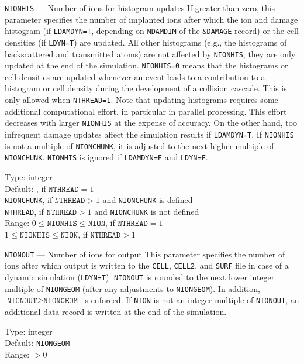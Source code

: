 \begin{keydescription}{\texttt{NIONHIS} --- Number of ions for histogram updates}
%
  If greater than zero, this parameter specifies the number of implanted ions
  after which the ion and damage histogram (if \texttt{LDAMDYN=T}, depending on 
  \texttt{NDAMDIM} of the \texttt{\&DAMAGE} record) or the cell
  densities (if \texttt{LDYN=T}) are updated. All other histograms (e.g., the 
  histograms of backscattered and transmitted atoms) are not affected
  by \texttt{NIONHIS}; they are only updated at the end of the simulation. 
  \texttt{NIONHIS=0} means that the histograms or cell densities are 
  updated whenever an event leads to a contribution to a histogram or cell
  density during the development of a collision cascade. This is only
  allowed when \texttt{NTHREAD=1}. Note that updating histograms requires some
  additional computational effort, in particular in parallel processing. This 
  effort decreases with larger \texttt{NIONHIS} at the expense of accuracy. On
  the other hand, too infrequent damage updates affect the simulation results
  if \texttt{LDAMDYN=T}. If \texttt{NIONHIS} is not a multiple of
  \texttt{NIONCHUNK}, it is adjusted to the next higher multiple of
  \texttt{NIONCHUNK}. \texttt{NIONHIS} is ignored if \texttt{LDAMDYN=F} and
  \texttt{LDYN=F}.
  \begin{keytab}
    Type:    \> integer \\
    Default: , if $\texttt{NTHREAD} = 1$ \\
             \> \texttt{NIONCHUNK}, if $\texttt{NTHREAD} > 1$ and
                \texttt{NIONCHUNK} is defined \\
             \> \texttt{NTHREAD}, if $\texttt{NTHREAD} > 1$ and
                \texttt{NIONCHUNK} is not defined \\
    Range:   \> $0 \le \texttt{NIONHIS} \le \texttt{NION}$, if
                $\texttt{NTHREAD} = 1$ \\
             \> $1 \le \texttt{NIONHIS} \le \texttt{NION}$, if 
                $\texttt{NTHREAD} > 1$
  \end{keytab}
\end{keydescription}

\begin{keydescription}{\texttt{NIONOUT} --- Number of ions for output}
%
  This parameter specifies the number of ions after which output is 
  written to the \texttt{CELL}, \texttt{CELL2}, and \texttt{SURF} file
  in case of a dynamic simulation (\texttt{LDYN=T}). \texttt{NIONOUT} is
  rounded to the next lower integer multiple of \texttt{NIONGEOM} (after
  any adjustments to \texttt{NIONGEOM}). In addition, $\texttt{NIONOUT}
  \ge \texttt{NIONGEOM}$ is enforced. If \texttt{NION} is not an 
  integer multiple of \texttt{NIONOUT}, an additional data record is 
  written at the end of the simulation.
  \begin{keytab}
    Type:    \> integer \\
    Default: \> \texttt{NIONGEOM} \\
    Range:   \> $> 0$
  \end{keytab}
\end{keydescription}

